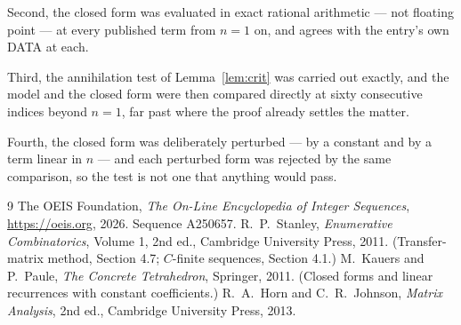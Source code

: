 \documentclass[11pt,a4paper]{article}
\theoremstyle{plain}
\theoremstyle{definition}
\begin{document}
Second, the closed form was evaluated in exact rational arithmetic --- not floating point ---
at every published term from $n=1$ on, and agrees with the entry's own DATA at each.

Third, the annihilation test of Lemma~\ref{lem:crit} was carried out exactly, and the model
and the closed form were then compared directly at sixty consecutive indices beyond
$n=1$, far past where the proof already settles the matter.

Fourth, the closed form was deliberately perturbed --- by a constant and by a term linear in
$n$ --- and each perturbed form was rejected by the same comparison, so the test is not one
that anything would pass.

\begin{thebibliography}{9}
 The OEIS Foundation, \emph{The On-Line Encyclopedia of Integer
Sequences}, \url{https://oeis.org}, 2026. Sequence A250657.
 R.~P.~Stanley, \emph{Enumerative Combinatorics}, Volume 1, 2nd ed.,
Cambridge University Press, 2011. (Transfer-matrix method, Section 4.7; $C$-finite sequences,
Section 4.1.)
 M.~Kauers and P.~Paule, \emph{The Concrete Tetrahedron}, Springer, 2011.
(Closed forms and linear recurrences with constant coefficients.)
 R.~A.~Horn and C.~R.~Johnson, \emph{Matrix Analysis}, 2nd ed., Cambridge
University Press, 2013.
\end{thebibliography}
\end{document}
